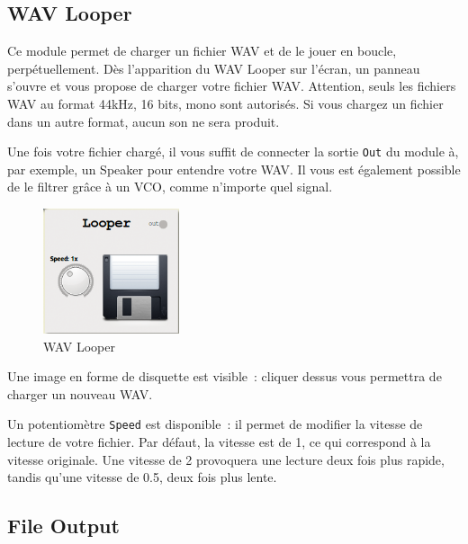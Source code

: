 \documentclass[a4paper,oneside,frenchb,10pt]{article}
\begin{document}
\subsection{WAV Looper}

\begin{multicols}{2}
Ce module permet de charger un fichier WAV et de le jouer en boucle,
perpétuellement. Dès l'apparition du WAV Looper sur l'écran, un panneau
s'ouvre et vous propose de charger votre fichier WAV. Attention, seuls
les fichiers WAV au format 44kHz, 16 bits, mono sont autorisés. Si vous
chargez un fichier dans un autre format, aucun son ne sera produit.

Une fois votre fichier chargé, il vous suffit de connecter la sortie
\verb!Out! du module à, par exemple, un Speaker pour entendre votre WAV.
Il vous est également possible de le filtrer grâce à un VCO, comme
n'importe quel signal.

\begin{figure}[H]
\centering
\includegraphics[width=4cm]{../img/png/wavlooper.png}
\caption{WAV Looper}
\end{figure}
\end{multicols}

Une image en forme de disquette est visible~: cliquer dessus vous
permettra de charger un nouveau WAV.

Un potentiomètre \verb!Speed! est disponible~: il permet de modifier la
vitesse de lecture de votre fichier. Par défaut, la vitesse est de 1, ce
qui correspond à la vitesse originale. Une vitesse de 2 provoquera une
lecture deux fois plus rapide, tandis qu'une vitesse de 0.5, deux fois
plus lente.

\subsection{File Output}
\end{document}
